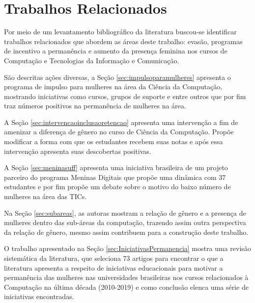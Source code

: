 \chapter{Trabalhos Relacionados}
\label{cap:trabRelacionados}
Por meio de um levantamento bibliográfico da literatura buscou-se identificar trabalhos relacionados que abordem as áreas  deste trabalho: evasão, programas de incentivo a permanência e aumento da presença feminina nos cursos de Computação e Tecnologias da Informação e Comunicação. 

São descritas ações diversas, a Seção \ref{sec:impulsoparamulheres} apresenta o programa de impulso para mulheres na área da Ciência da Computação, mostrando iniciativas como cursos, grupos de suporte e entre outros que por fim traz números positivos na permanência de mulheres na área. 

A Seção \ref{sec:intervencaoinclusaoretencao} apresenta uma intervenção a fim de amenizar a diferença de gênero no curso de Ciência da Computação. Propõe modificar a forma com que os estudantes recebem suas notas e após essa intervenção apresenta suas descobertas positivas. 

A Seção \ref{sec:meninasuff} apresenta uma iniciativa brasileira de um projeto parceiro do programa Meninas Digitais que propõe uma dinâmica com 37 estudantes e por fim propõe um debate sobre o motivo do baixo número de mulheres na área das TICs.

Na Seção \ref{sec:subareas}, as autoras mostram a relação de gênero e a presença de mulheres dentro das sub-áreas da computação, trazendo assim outra perspectiva da relação de gênero, mesmo assim contribuem para a construção deste trabalho.

O trabalho apresentado na Seção \ref{sec:IniciativasPermanencia} mostra uma revisão sistemática da literatura, que seleciona 73 artigos para encontrar o que a literatura apresenta a respeito de iniciativas educacionais para motivar a permanência das mulheres nas universidades brasileiras nos cursos relacionados à Computação na última década (2010-2019) e como conclusão elenca uma série de iniciativas encontradas.%


